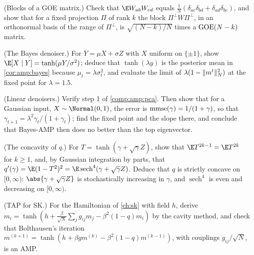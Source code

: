 \begin{refsection}
\begin{exercises}
\item \consolidation (Blocks of a GOE matrix.) Check that $\E W_{ab}W_{cd}$ equals $\frac1N(\delta_{ac}\delta_{bd}+\delta_{ad}\delta_{bc})$, and show that for a fixed projection $\Pi$ of rank $k$ the block $\Pi^\perp W\Pi^\perp$, in an orthonormal basis of the range of $\Pi^\perp$, is $\sqrt{(N-k)/N}$ times a $\mathrm{GOE}(N-k)$ matrix.\label{ex:amp:goe}

\item \consolidation (The Bayes denoiser.) For $Y=\mu X+\sigma Z$ with $X$ uniform on $\{\pm1\}$, show $\E[X\mid Y]=\tanh(\mu Y/\sigma^2)$; deduce that $\tanh(\lambda y)$ is the posterior mean in \cref{cor:amp:bayes} because $\mu_t=\lambda\sigma_t^2$, and evaluate the limit of $\lambda(1-\lVert m^t\rVert_N^2)$ at the fixed point for $\lambda=1.5$.\label{ex:amp:nishimori}

\item \consolidation (Linear denoisers.) Verify step 1 of \cref{comp:amp:pca}. Then show that for a Gaussian input, $X\sim\Normal(0,1)$, the error is $\mathrm{mmse}(\gamma)=1/(1+\gamma)$, so that $\gamma_{t+1}=\lambda^2\gamma_t/(1+\gamma_t)$; find the fixed point and the slope there, and conclude that Bayes-AMP then does no better than the top eigenvector.\label{ex:amp:gaussian}

\item \consolidation (The concavity of $q$.) For $T=\tanh(\gamma+\sqrt\gamma Z)$, show that $\E T^{2k-1}=\E T^{2k}$ for $k\ge1$, and, by Gaussian integration by parts, that $q'(\gamma)=\E(1-T^2)^2=\E\operatorname{sech}^4(\gamma+\sqrt\gamma Z)$. Deduce that $q$ is strictly concave on $[0,\infty)$: $\abs{\gamma+\sqrt\gamma Z}$ is stochastically increasing in $\gamma$, and $\operatorname{sech}^4$ is even and decreasing on $[0,\infty)$.\label{ex:amp:concave}

\item \byhand (TAP for SK.) For the Hamiltonian of \cref{ch:sk} with field $h$, derive $m_i=\tanh(h+\frac\beta{\sqrt N}\sum_jg_{ij}m_j-\beta^2(1-q)m_i)$ by the cavity method, and check that Bolthausen's iteration $m^{(k+1)}=\tanh(h+\beta gm^{(k)}-\beta^2(1-q)m^{(k-1)})$, with couplings $g_{ij}/\sqrt N$, is an AMP.\label{ex:amp:sk}


\end{exercises}
\end{refsection}
